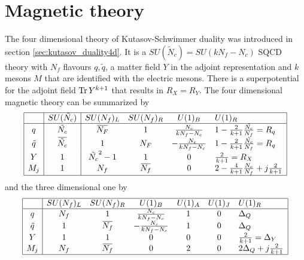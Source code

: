 \section{Magnetic theory}
The four dimensional theory of Kutasov-Schwimmer duality was introduced in section \ref{sec:kutasov_duality4d}. 
It is a $SU(\tilde{N}_c) = SU( k N_f - N_c)$ SQCD theory with $N_f$ flavours $q,\tilde{q} $, a matter field $Y$ in the adjoint representation and $k$ mesons $M$ that are identified with the electric mesons. There is a superpotential for the adjoint field $ \mathrm{Tr } \, Y^{k+1}$ that results in $R_X = R_Y$.
The four dimensional magnetic theory can be summarized by
\begin{equation}
\begin{array}{|c |  c | c c c l |}
\hline
 & SU(\tilde{N_c})  & SU(N_f)_L  &SU(N_f)_R   & U(1)_B &  U(1)_R \\
\hline
q &  \tilde{N_c} & \overbar{N_F}  & 1   &   \frac{N_c}{k N_f - N_c }  &  1 - \frac{2}{k+1} \frac{ \tilde{N_c}}{N_f} = R_q   \\
\tilde{q} & \overbar{\tilde{N_c}}  & 1  &  N_F  & -\frac{N_c}{k N_f - N_c }   &   1 - \frac{2}{k+1} \frac{\tilde{N_c}}{N_f}  = R_q   \\
Y & 1  &  \tilde{N_c}^2-1  & 1    & 0   &   \frac{2}{k+1} = R_X  \\
 M_j & 1 & N_f &  \overbar{N_f} & 0 & 2 - \frac{4}{k+1} \frac{N_c}{N_f} + j \frac{2}{k+1} \\
 \hline
\end{array}
\end{equation}
%
and the three dimensional one by
%
\begin{equation}
\begin{array}{ | c | c c c c c l | } 
 \hline
  & SU(N_f)_L & SU(N_f)_R & U(1)_B & U(1)_A & U(1)_J  & U(1)_R   \\
 \hline
 q & N_f & 1 & \frac{N_c}{k N_f - N_c} & 1 & 0   & \Delta_Q  \\  
 \tilde{q} & 1 & \overbar{N_f}& - \frac{N_c}{k N_f - N_c}  & 1 & 0 & \Delta_Q      \\  
  Y & 1 & 1  & 0 & 0 & 0 & \frac{2}{k+1}= \Delta_Y    \\ 
  M_j & N_f & \overbar{N_f} & 0 & 2  &  0& 2 \Delta_Q + j \frac{2}{k+1} \\
 \hline
\end{array}
\label{tab:kim-park-magnetic}
\end{equation}




